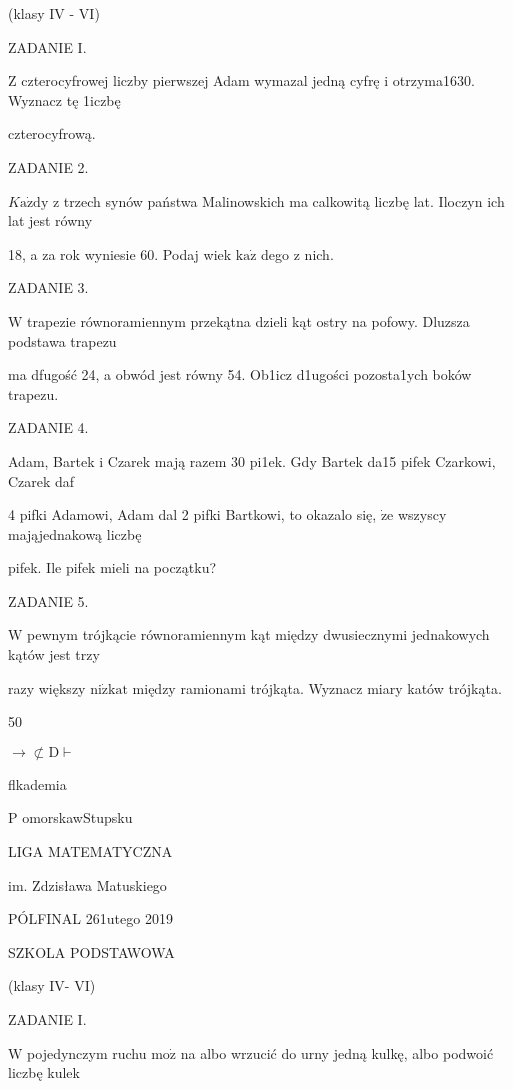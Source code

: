 \documentclass[a4paper,12pt]{article}
\begin{document}
(klasy IV - VI)

ZADANIE I.

$\mathrm{Z}$ czterocyfrowej liczby pierwszej Adam wymazal jedną cyfrę i otrzyma1630. Wyznacz tę 1iczbę

czterocyfrową.

ZADANIE 2.

$K\mathrm{a}\dot{\mathrm{z}}\mathrm{d}\mathrm{y}$ z trzech synów państwa Malinowskich ma calkowitą liczbę lat. Iloczyn ich lat jest równy

18, a za rok wyniesie 60. Podaj wiek $\mathrm{k}\mathrm{a}\dot{\mathrm{z}}$ dego z nich.

ZADANIE 3.

$\mathrm{W}$ trapezie równoramiennym przekątna dzieli kąt ostry na pofowy. Dluzsza podstawa trapezu

ma dfugość 24, a obwód jest równy 54. Ob1icz d1ugości pozosta1ych boków trapezu.

ZADANIE 4.

Adam, Bartek i Czarek mają razem 30 pi1ek. Gdy Bartek da15 pifek Czarkowi, Czarek daf

4 pifki Adamowi, Adam dal 2 pifki Bartkowi, to okazalo się, $\dot{\mathrm{z}}\mathrm{e}$ wszyscy mająjednakową liczbę

pifek. Ile pifek mieli na początku?

ZADANIE 5.

$\mathrm{W}$ pewnym trójkącie równoramiennym kąt między dwusiecznymi jednakowych kątów jest trzy

razy większy $\mathrm{n}\mathrm{i}\dot{\mathrm{z}}\mathrm{k}\mathrm{a}\mathrm{t}$ między ramionami trójkąta. Wyznacz miary katów trójkąta.






50

$\rightarrow\not\subset \mathrm{D}\vdash$

flkademia

P omorskawStupsku

LIGA MATEMATYCZNA

im. Zdzisława Matuskiego

PÓLFINAL 261utego 2019

SZKOLA PODSTAWOWA

(klasy IV- VI)

ZADANIE I.

$\mathrm{W}$ pojedynczym ruchu $\mathrm{m}\mathrm{o}\dot{\mathrm{z}}$ na albo wrzucić do urny jedną kulkę, albo podwoić liczbę kulek
\end{document}
